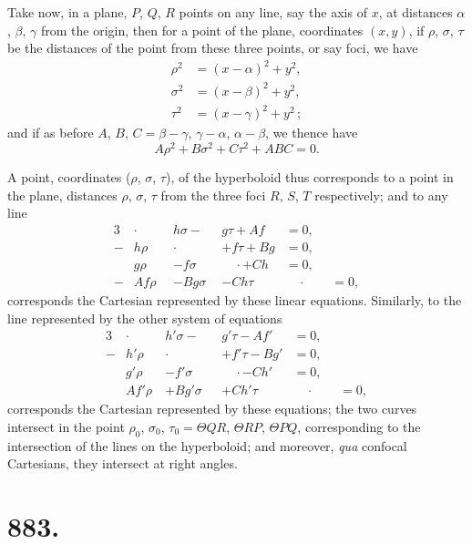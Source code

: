 \documentclass[11pt,a4paper]{book}
\begin{document}
Take now, in a plane, $P$, $Q$, $R$ points on any line, say the axis of $x$, at distances $\alpha$, $\beta$, $\gamma$ from the origin, then for a point of the plane, coordinates $(x, y)$, if $\rho$, $\sigma$, $\tau$ be the distances of the point from these three points, or say foci, we have
\begin{align*}
\rho^2 &= (x-\alpha)^2 + y^2, \\
\sigma^2 &= (x-\beta)^2 + y^2, \\
\tau^2 &= (x-\gamma)^2 + y^2\,;
\end{align*}
and if as before $A$, $B$, $C = \beta-\gamma$, $\gamma-\alpha$, $\alpha-\beta$, we thence have
\[ A\rho^2 + B\sigma^2 + C\tau^2 + ABC = 0. \]

A point, coordinates ($\rho$, $\sigma$, $\tau$), of the hyperboloid thus corresponds to a point in the plane, distances $\rho$, $\sigma$, $\tau$ from the three foci $R$, $S$, $T$ respectively; and to any line
\begin{alignat*}{3}
&\cdot\qquad & h\sigma -\phantom{g}\, &g\tau + Af &= 0, \\
-&h\rho &\cdot\qquad & + f\tau + Bg &= 0, \\
&g\rho & - f\sigma &\quad\cdot + Ch &= 0, \\
-&Af\rho & - Bg\sigma & - Ch\tau &\quad\cdot\qquad = 0,
\end{alignat*}
corresponds the Cartesian represented by these linear equations. Similarly, to the line represented by the other system of equations
\begin{alignat*}{3}
&\cdot\qquad & h'\sigma -\phantom{g'}\, &g'\tau - Af' &= 0, \\
-&h'\rho &\cdot\qquad & + f'\tau - Bg' &= 0, \\
&g'\rho & - f'\sigma &\quad\cdot - Ch' &= 0, \\
&Af'\rho & + Bg'\sigma & + Ch'\tau &\quad\cdot\qquad = 0,
\end{alignat*}
corresponds the Cartesian represented by these equations; the two curves intersect in the point $\rho_0$, $\sigma_0$, $\tau_0 = \Theta QR$, $\Theta RP$, $\Theta PQ$, corresponding to the intersection of the lines on the hyperboloid; and moreover, \textit{qua} confocal Cartesians, they intersect at right angles.


\newpage
\section*{883.}
\end{document}

